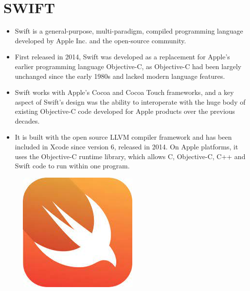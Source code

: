 \documentclass{article}
\begin{document}
\section*{SWIFT}
\begin{itemize}
		\item Swift is a general-purpose, multi-paradigm, compiled programming language developed by Apple Inc. and the open-source community. 
	\item First released in 2014, Swift was developed as a replacement for Apple's earlier programming language Objective-C, as Objective-C had been largely unchanged since the early 1980s and lacked modern language features. 
	\item Swift works with Apple's Cocoa and Cocoa Touch frameworks, and a key aspect of Swift's design was the ability to interoperate with the huge body of existing Objective-C code developed for Apple products over the previous decades. 
	\item It is built with the open source LLVM compiler framework and has been included in Xcode since version 6, released in 2014. On Apple platforms, it uses the Objective-C runtime library, which allows C, Objective-C, C++ and Swift code to run within one program.
\end{itemize}
\begin{figure}
		\begin{center}
	\includegraphics[width=0.3\linewidth]{swift.jpg}
\end{center}
\end{figure}
\newpage
\pagecolor{black}
\color{white}
\end{document}
